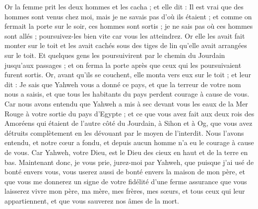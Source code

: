 \begin{multicols}{2}
Or la femme prit les deux hommes et les cacha ; et elle dit : Il est vrai que des hommes sont venus chez moi, mais je ne savais pas d'où ils étaient ;
et comme on fermait la porte sur le soir, ces hommes sont sortis ; je ne sais pas où ces hommes sont allés ; poursuivez-les bien vite car vous les atteindrez.
Or elle les avait fait monter sur le toit et les avait cachés sous des tiges de lin qu'elle avait arrangées sur le toit.
Et quelques gens les poursuivirent par le chemin du Jourdain jusqu'aux passages ; et on ferma la porte après que ceux qui les poursuivaient furent sortis.
Or, avant qu'ils se couchent, elle monta vers eux sur le toit ;
et leur dit : Je sais que Yahweh vous a donné ce pays, et que la terreur de votre nom nous a saisis, et que tous les habitants du pays perdent courage à cause de vous.
Car nous avons entendu que Yahweh a mis à sec devant vous les eaux de la Mer Rouge à votre sortie du pays d'Egypte ; et ce que vous avez fait aux deux rois des Amoréens qui étaient de l'autre côté du Jourdain, à Sihon et à Og, que vous avez détruits complètement en les dévouant par le moyen de l'interdit.
Nous l'avons entendu, et notre cœur a fondu, et depuis aucun homme n'a eu le courage à cause de vous. Car Yahweh, votre Dieu, est le Dieu des cieux en haut et de la terre en bas.
Maintenant donc, je vous prie, jurez-moi par Yahweh, que puisque j'ai usé de bonté envers vous, vous userez aussi de bonté envers la maison de mon père, 
et que vous me donnerez un signe de votre fidélité d'une ferme assurance que vous laisserez vivre mon père, ma mère, mes frères, mes sœurs, et tous ceux qui leur appartiennent, et que vous sauverez nos âmes de la mort.

\end{multicols}
